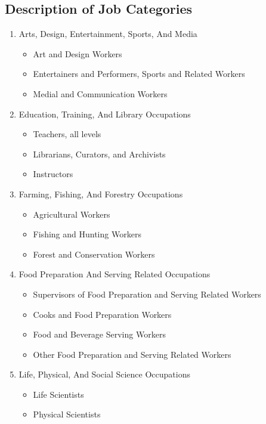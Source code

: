 \documentclass{article}
\begin{document}
\subsection{Description of Job Categories}
\begin{enumerate}
    \item Arts, Design, Entertainment, Sports, And Media
        \begin{itemize}
            \item Art and Design Workers
            \item Entertainers and Performers, Sports and Related Workers
            \item Medial and Communication Workers
        \end{itemize}
    \item  Education, Training, And Library Occupations
        \begin{itemize}
            \item Teachers, all levels
            \item Librarians, Curators, and Archivists
            \item Instructors
        \end{itemize}
    \item  Farming, Fishing, And Forestry Occupations
        \begin{itemize}
            \item  Agricultural Workers
            \item Fishing and Hunting Workers
            \item Forest and Conservation Workers
        \end{itemize}
    \item  Food Preparation And Serving Related Occupations
        \begin{itemize}
            \item Supervisors of Food Preparation and Serving Related Workers
            \item Cooks and Food Preparation Workers
            \item Food and Beverage Serving Workers
            \item Other Food Preparation and Serving Related Workers
        \end{itemize}
    \item  Life, Physical, And Social Science Occupations
        \begin{itemize}
            \item Life Scientists
            \item Physical Scientists

\end{itemize}
\end{enumerate}
\end{document}
